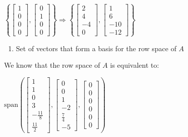 \documentclass[
  letterpaper,
  DIV=11,
  numbers=noendperiod]{scrartcl}
\providecommand{\tightlist}{%
  \setlength{\itemsep}{0pt}\setlength{\parskip}{0pt}}\usepackage{longtable,booktabs,array}
\begin{document}
\(\left\{\begin{bmatrix}1 \\ 0 \\ 0 \\ 0\end{bmatrix},\begin{bmatrix}0 \\ 1 \\ 0 \\ 0\end{bmatrix}\right\} \Rightarrow \left\{\begin{bmatrix}2 \\ 4 \\ -4 \\ 0\end{bmatrix},\begin{bmatrix}1 \\ 6 \\ -10 \\ -12 \end{bmatrix}\right\}\)

\newpage{}

\begin{enumerate}
\def\labelenumi{\alph{enumi}.}
\setcounter{enumi}{1}
\tightlist
\item
  Set of vectors that form a basis for the row space of \(A\)
\end{enumerate}

We know that the row space of \(A\) is equivalent to:

\(\mathrm{span}\left(\begin{bmatrix}1 \\ 1 \\ 0 \\ 3 \\ -\frac{11}{8} \\ \frac{11}{2}\end{bmatrix},\begin{bmatrix}0 \\ 0 \\ 1 \\ -2 \\ \frac{7}{4} \\ -5\end{bmatrix},\begin{bmatrix}0 \\ 0 \\ 0 \\ 0 \\ 0 \\ 0\end{bmatrix} \right)\)
\end{document}
